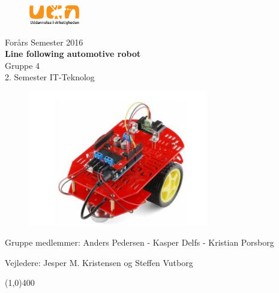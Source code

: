 \clearpage
\thispagestyle{empty}

\begin{figure}[H]
	\raggedleft
		\includegraphics[width=0.2\textwidth]{figures/logo-ucn.png}
\end{figure}
\vspace*{\fill} 
\begin{center}
\begin{Huge}
Forårs Semester 2016\\
\vspace{5 mm}
\textbf{Line following automotive robot}\\
\vspace{3 mm}
Gruppe 4\\
\vspace{3 mm}
2. Semester IT-Teknolog
\end{Huge}
\end{center}

\begin{figure}[h!]
  \centering
  \includegraphics[width=0.7\textwidth]{figures/Produktet.png}
\end{figure}

\vspace*{\fill}
\begin{center}
Gruppe medlemmer:
 Anders Pedersen - Kasper Delfs - Kristian Porsborg
\end{center}
\begin{center}
Vejledere: Jesper M. Kristensen og Steffen Vutborg
\end{center}
\begin{center}
\line(1,0){400}
\end{center}
